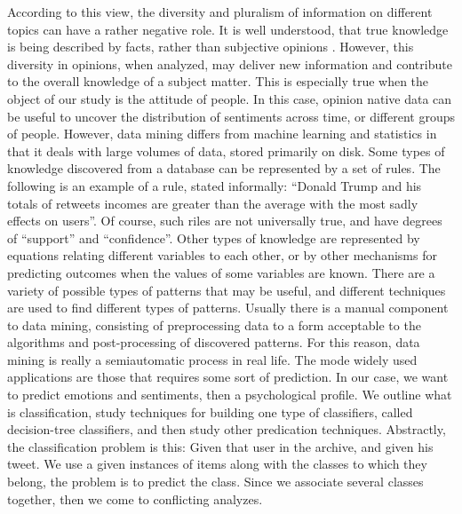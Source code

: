 \documentclass{acmtog} %
\begin{document}
\begin{table}[H]
\label{tab:cross_tab}
\end{table}

According to this view, the diversity and pluralism of information on different topics can have a rather negative role. It is well understood, that true knowledge is being described by facts, rather than subjective opinions \cite{ThakkarP15}. However, this diversity in opinions, when analyzed, may deliver new information and contribute to the overall knowledge of a subject matter. This is especially true when the object of our study is the attitude of people. In this case, opinion native data can be useful to uncover the distribution of sentiments across time, or different groups of people. However, data mining differs from machine learning and statistics in that it deals with large volumes of data, stored primarily on disk. Some types of knowledge discovered from a database can be represented by a set of rules. The following is an example of a rule, stated informally: “Donald Trump and his totals of retweets incomes are greater than the average with the most sadly effects on users”. Of course, such riles are not universally true, and have degrees of “support” and “confidence”. Other types of knowledge are represented by equations relating different variables to each other, or by other mechanisms for predicting outcomes when the values of some variables are known. There are a variety of possible types of patterns that may be useful, and different techniques are used to find different types of patterns. Usually there is a manual component to data mining, consisting of preprocessing data to a form acceptable to the algorithms and post-processing of discovered patterns. For this reason, data mining is really a semiautomatic process in real life. The mode widely used applications are those that requires some sort of prediction. In our case, we want to predict emotions and sentiments, then a psychological profile. We outline what is classification, study techniques for building one type of classifiers, called decision-tree classifiers, and then study other predication techniques. Abstractly, the classification problem is this: Given that user in the archive, and given his tweet. We use a given instances of items along with the classes to which they belong, the problem is to predict the class. Since we associate several classes together, then we come to conflicting analyzes. 
\end{document}
